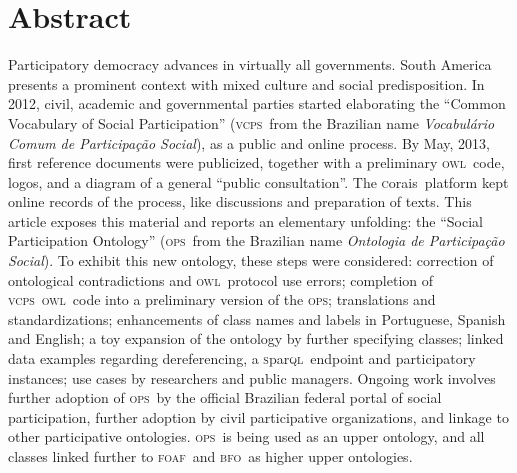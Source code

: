 \documentclass[10pt,letterpaper]{article}
\newcommand{\ops}{\textsc{ops}}
\newcommand{\vcps}{\textsc{vcps}}
\newcommand{\owl}{\textsc{owl}}
\newcommand{\sparql}{\textsc{s}par\textsc{ql}}
\newcommand{\bfo}{\textsc{bfo}}
\newcommand{\foaf}{\textsc{foaf}}
\newcommand{\corais}{\textsc{c}orais}
\begin{document}
\section*{Abstract}
    Participatory democracy advances in virtually all governments. South America presents a prominent context with mixed culture and social predisposition. In 2012, civil, academic and governmental parties started elaborating the ``Common Vocabulary of Social Participation'' (\vcps\ from the Brazilian name \emph{Vocabul\'ario Comum de Participa\c{c}\~ao Social}), as a public and online process. By May, 2013, first reference documents were publicized, together with a preliminary \owl\ code,
logos, and a diagram of a general ``public consultation''.
The \corais\ platform kept online records of the process, like discussions and preparation of texts. 
This article exposes this material and reports an elementary unfolding: the ``Social Participation Ontology'' (\ops\ from the Brazilian name \emph{Ontologia de Participa\c{c}\~ao Social}). To exhibit this new ontology, these steps were considered: correction of ontological contradictions and \owl\ protocol use errors; completion of \vcps\ \owl\ code into a preliminary version of the \ops; translations and standardizations; enhancements of class names and labels in Portuguese, Spanish and English; a toy expansion of the ontology by further specifying classes; linked data examples regarding dereferencing, a \sparql\ endpoint and participatory instances; use cases by researchers and public managers. Ongoing work involves further adoption of \ops\ by the official Brazilian federal portal of social participation, further adoption by civil participative organizations, and linkage to other participative ontologies. \ops\ is being used as an upper ontology, and all classes linked further to \foaf\ and \bfo\ as higher upper ontologies.



%
\linenumbers
\end{document}
